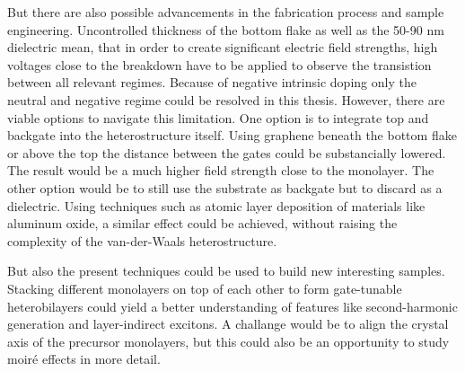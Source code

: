 But there are also possible advancements in the fabrication process and sample engineering. Uncontrolled thickness of the bottom \hbng flake as well as the 50-90 nm \sio dielectric mean, that in order to create significant electric field strengths, high voltages close to the breakdown have to be applied to observe the transistion between all relevant regimes. Because of negative intrinsic doping only the neutral and negative regime could be resolved in this thesis. However, there are viable options to navigate this limitation. One option is to integrate top and backgate into the heterostructure itself. Using graphene beneath the bottom \hbng flake or above the top the distance between the gates could be substancially lowered. The result would be a much higher field strength close to the monolayer. The other option would be to still use the substrate as backgate but to discard \sio as a dielectric. Using techniques such as atomic layer deposition of materials like aluminum oxide, a similar effect could be achieved, without raising the complexity of the van-der-Waals heterostructure.

But also the present techniques could be used to build new interesting samples. Stacking different \tmdg monolayers on top of each other to form gate-tunable heterobilayers could yield a better understanding of features like second-harmonic generation and layer-indirect excitons. A challange would be to align the crystal axis of the precursor monolayers, but this could also be an opportunity to study moiré effects in more detail.